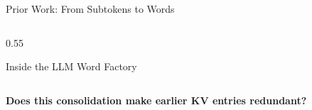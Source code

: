 \documentclass{beamer}
\begin{document}
\begin{frame}{Prior Work: From Subtokens to Words}
\begin{columns}[T,onlytextwidth]
\begin{column}{0.55\textwidth}
        \vspace{0.05cm}

        {\tiny Inside the LLM Word Factory \\
        \textcite{busigin2026inside}}

    \end{column}

\end{columns}

\vspace{0.18cm}

\begin{center}
    {\footnotesize
    \color{blue!60!black}
    \bfseries
    Does this consolidation make earlier
    KV entries redundant?
    \par}
\end{center}

\end{frame}
\end{document}
